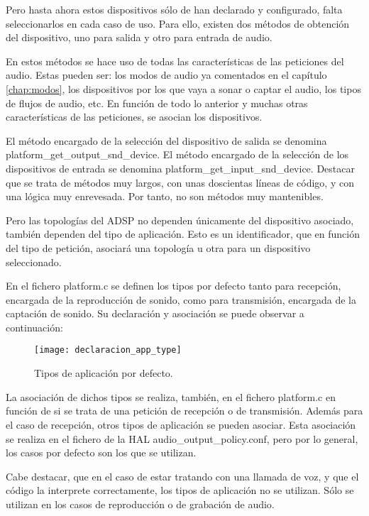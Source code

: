 Pero hasta ahora estos dispositivos sólo de han declarado y configurado, falta seleccionarlos en cada caso de uso. Para ello, existen dos métodos de obtención del dispositivo, uno para salida y otro para entrada de audio. 

En estos métodos se hace uso de todas las características de las peticiones del audio. Estas pueden ser: los modos de audio ya comentados en el capítulo \ref{chap:modos}, los dispositivos por los que vaya a sonar o captar el audio, los tipos de flujos de audio, etc. En función de todo lo anterior y muchas otras características de las peticiones, se asocian los dispositivos.

El método encargado de la selección del dispositivo de salida se denomina platform\_get\_output\_snd\_device. El método encargado de la selección de los dispositivos de entrada se denomina platform\_get\_input\_snd\_device. Destacar que se trata de métodos muy largos, con unas doscientas líneas de código, y con una lógica muy enrevesada. Por tanto, no son métodos muy mantenibles.

Pero las topologías del \gls{ADSP} no dependen únicamente del dispositivo asociado, también dependen del tipo de aplicación. Esto es un identificador, que en función del tipo de petición, asociará una topología u otra para un dispositivo seleccionado.

En el fichero platform.c se definen los tipos por defecto tanto para recepción, encargada de la reproducción de sonido, como para transmisión, encargada de la captación de sonido. Su declaración y asociación se puede observar a continuación:

\begin{figure}[H]
	\centering
	\texttt{[image: declaracion\_app\_type]}
	\caption{Tipos de aplicación por defecto.} 
	\label{fig:default_app_type}
\end{figure} 

La asociación de dichos tipos se realiza, también, en el fichero platform.c en función de si se trata de una petición de recepción o de transmisión. Además para el caso de recepción, otros tipos de aplicación se pueden asociar. Esta asociación se realiza en el fichero de la \gls{HAL} audio\_output\_policy.conf, pero por lo general, los casos por defecto son los que se utilizan.

Cabe destacar, que en el caso de estar tratando con una llamada de voz, y que el código la interprete correctamente, los tipos de aplicación no se utilizan. Sólo se utilizan en los casos de reproducción o de grabación de audio.

